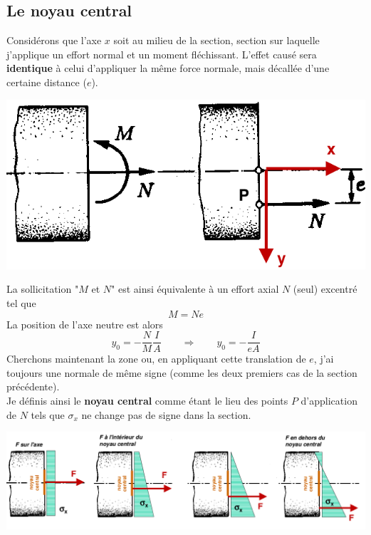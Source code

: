 	\subsection{Le noyau central}
	Considérons que l'axe $x$ soit au milieu de la section, section sur laquelle 
	j'applique un effort normal et un moment fléchissant. L'effet causé sera 
	\textbf{identique} à celui d'appliquer la même force normale, mais décallée 
	d'une certaine distance ($e$).
	\begin{center}
	\includegraphics[scale=0.4]{ch7/image3.png}
	\end{center}
	La sollicitation "$M$ et $N$" est ainsi équivalente à un effort axial $N$ 
	(seul) excentré tel que 
	\begin{equation}
	M = Ne
	\end{equation}
	La position de l'axe neutre est alors 
	\begin{equation}
	y_0=-\dfrac{N}{M}\dfrac{I}{A}\qquad\Longrightarrow\qquad y_0=-\dfrac{I}{eA}
	\end{equation}
	Cherchons maintenant la zone ou, en appliquant cette translation de $e$, j'ai 
	toujours une normale de même signe (comme les deux premiers cas de la section 
	précédente). \\
	Je définis ainsi le \textbf{noyau central} comme étant le lieu des points 
	$P$ d’application de $N$ tels que $\sigma_x$ ne change pas de signe dans la 
	section.
	\begin{center}
	\includegraphics[scale=0.4]{ch7/image4.png}
	\end{center}
	
	
	
	
	
	
	
	
	
	
	
	
	